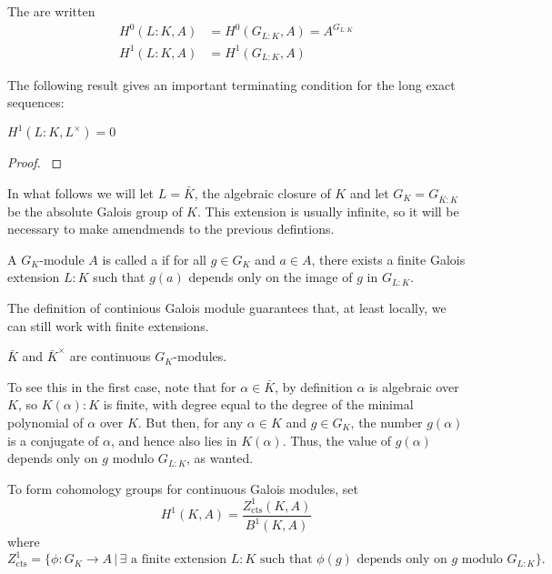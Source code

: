 \documentclass[12pt, a4paper]{report}
\begin{document}
\begin{defn}
  The  are written
  \begin{equation*}
    \begin{split}
      H^0(L:K, A) &= H^0(G_{L:K}, A) = A^{G_{L:K}} \\
      H^1(L:K, A) &= H^1(G_{L:K}, A)
     \end{split}
   \end{equation*}
\end{defn}

The following result gives an important terminating condition for the
long exact sequences:

\begin{thm}
  $  H^1(L : K, L^{\times}) = 0$
\end{thm}
\begin{proof}
  \cite[See][Chapter X, page 150]{cohomology}
\end{proof}

In what follows we will let $L = \bar{K}$, the algebraic closure of $K$ and let
$G_K = G_{\bar{K}:K}$ be the absolute Galois group of $K$.
This extension is usually infinite, so
it will be necessary to make amendmends to the previous defintions. 

\begin{defn}
  A $G_K$-module $A$ is called a 
  if for all $g \in G_K$ and $ a \in A$,
  there exists a finite Galois extension $L:K$ such that $g(a)$
  depends only on the image of $g$ in $G_{L:K}$.
\end{defn}

The definition of continious Galois module guarantees that, at least locally, we
can still work with finite extensions.

\begin{example}
  $\bar{K}$ and $ \bar{K}^{\times}$ are continuous $G_K$-modules.

  To see this in the first case,
  note that for $\alpha \in \bar{K}$, by definition $\alpha$ is algebraic over
  $K$, so $K(\alpha) : K$ is finite, with degree equal to the degree of the
  minimal polynomial of $\alpha$ over $K$.
  But then, for any $\alpha \in K$ and $g \in G_K$, the number $g(\alpha)$ is a conjugate
  of $\alpha$, and hence also lies in $K(\alpha).$ Thus, the value of
  $g(\alpha)$ depends only on $g$ modulo $G_{L:K}$, as wanted.
\end{example}

To form cohomology groups for continuous Galois modules, set
\[H^1(K,A) = \frac{Z^1_{\text{cts}}(K,A)}{B^1(K,A)}\]
where
\[Z^1_{\text{cts}} = \{\phi : G_K \rightarrow A \, | \, \exists \text{ a finite
    extension } L : K
  \text{ such that } \phi(g) \text{ depends only on } g \text{ modulo } G_{L:K}\}.\]
\end{document}
